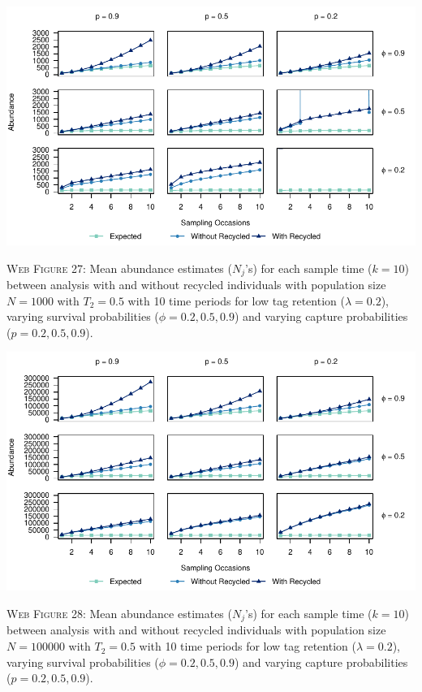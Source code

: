 \documentclass[]{article}
\begin{document}
\newpage

\includegraphics{Appendix_files/figure-latex/27_abundance_L_GJSTL4-1.pdf}

\textsc{Web Figure 27:} Mean abundance estimates (\(N_j\)'s) for each
sample time (\(k=10\)) between analysis with and without recycled
individuals with population size \(N=1000\) with \(T_2=0.5\) with 10
time periods for low tag retention (\(\lambda=0.2\)), varying survival
probabilities (\(\phi=0.2,0.5,0.9\)) and varying capture probabilities
(\(p=0.2,0.5,0.9\)).

\includegraphics{Appendix_files/figure-latex/28_abundance_L_GJSTL3-1.pdf}

\textsc{Web Figure 28:} Mean abundance estimates (\(N_j\)'s) for each
sample time (\(k=10\)) between analysis with and without recycled
individuals with population size \(N=100000\) with \(T_2=0.5\) with 10
time periods for low tag retention (\(\lambda=0.2\)), varying survival
probabilities (\(\phi=0.2,0.5,0.9\)) and varying capture probabilities
(\(p=0.2,0.5,0.9\)).

\newpage
\end{document}

